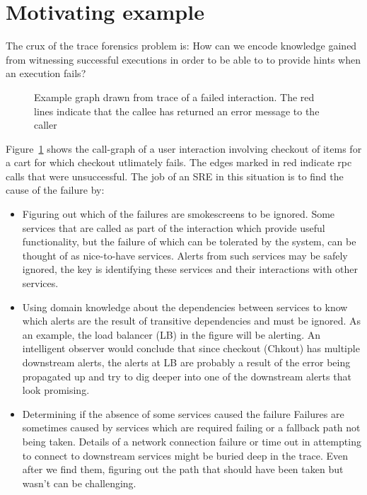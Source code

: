 \section{Motivating example}
The crux of the trace forensics problem is: How can we encode knowledge gained from witnessing successful executions in order to be able to to provide hints when an execution fails?

\begin{figure}[h]
\caption{Example graph drawn from trace of a failed interaction. The red lines indicate that the callee has returned an error message to the caller}
\label{Failed_ex}
\end{figure}

Figure~\ref{Failed_ex} shows the  call-graph of a user interaction involving checkout of items for a cart for which checkout utlimately fails. The edges marked in red indicate rpc calls that were unsuccessful. The job of an SRE in this situation is to find the cause of the failure by:
\begin{itemize}
\item Figuring out which of the failures are smokescreens to be ignored. \newline
Some services that are called as part of the interaction which provide useful functionality, but the failure of which can be tolerated by the system, can be thought of as nice-to-have services. Alerts from such services may be safely ignored, the key is identifying these services and their interactions with other services. 
\item Using domain knowledge about the dependencies between services to know which alerts are the result of transitive dependencies and must be ignored. \newline
As an example, the load balancer (LB) in the figure will be alerting. An intelligent observer would conclude that since checkout (Chkout) has multiple downstream alerts, the alerts at LB are probably a result of the error being propagated up and try to dig deeper into one of the downstream alerts that look promising.
\item Determining if the absence of some services caused the failure \newline
Failures are sometimes caused by services which are required failing or a fallback path not being taken. Details of a network connection failure or time out in attempting to connect to downstream services might be buried deep in the trace. Even after we find them, figuring out the path that should have been taken but wasn't can be challenging. 
\end{itemize}
